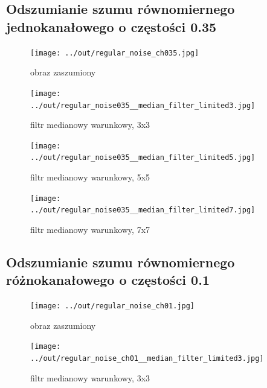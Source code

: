 \documentclass[a4paper,12pt]{article}
\begin{document}
\newpage
\subsection{Odszumianie szumu równomiernego jednokanałowego o częstości 0.35}
\begin{figure}[h!]
\begin{minipage}[t]{7.5cm}
\begin{center}
\texttt{[image: ../out/regular\_noise\_ch035.jpg]}
\caption{obraz zaszumiony}
\end{center}
\end{minipage}
\hfill
\begin{minipage}[t]{7.5cm}
\begin{center}
\texttt{[image: ../out/regular\_noise035\_\_median\_filter\_limited3.jpg]}
\caption{filtr medianowy warunkowy, 3x3}
\end{center}
\end{minipage}
\end{figure}

\begin{figure}[h!]
\begin{minipage}[t]{7.5cm}
\begin{center}
\texttt{[image: ../out/regular\_noise035\_\_median\_filter\_limited5.jpg]}
\caption{filtr medianowy warunkowy, 5x5}
\end{center}
\end{minipage}
\hfill
\begin{minipage}[t]{7.5cm}
\begin{center}
\texttt{[image: ../out/regular\_noise035\_\_median\_filter\_limited7.jpg]}
\caption{filtr medianowy warunkowy, 7x7}
\end{center}
\end{minipage}
\end{figure}


\newpage
\subsection{Odszumianie szumu równomiernego różnokanałowego o częstości 0.1}
\begin{figure}[h!]
\begin{minipage}[t]{7.5cm}
\begin{center}
\texttt{[image: ../out/regular\_noise\_ch01.jpg]}
\caption{obraz zaszumiony}
\end{center}
\end{minipage}
\hfill
\begin{minipage}[t]{7.5cm}
\begin{center}
\texttt{[image: ../out/regular\_noise\_ch01\_\_median\_filter\_limited3.jpg]}
\caption{filtr medianowy warunkowy, 3x3}
\end{center}
\end{minipage}
\end{figure}
\end{document}
